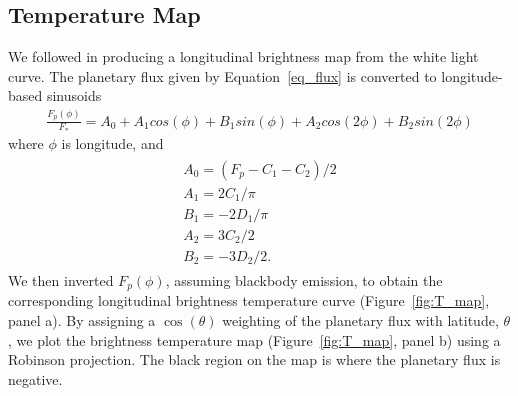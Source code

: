 \documentclass[pdflatex,sn-standardnature]{sn-jnl}%
\begin{document}


\subsection*{Temperature Map}



We followed \cite{cowan2008} in producing a longitudinal brightness map from the white light curve. The planetary flux given by Equation~\ref{eq_flux} is converted to longitude-based sinusoids 
\begin{align}
    \frac{F_p(\phi)}{F_*} = A_0 +A_1cos(\phi)+B_1sin(\phi)+A_2cos(2\phi)+B_2sin(2\phi)
\end{align}
where $\phi$ is longitude, and 
\begin{align}
\begin{array}{l}
A_0 = (F_p-C_1-C_2)/2 \\
A_1 = 2C_1/\pi \\
B_1 = -2D_1/\pi \\
A_2 = 3C_2/2 \\
B_2=-3D_2/2.
\end{array}
\end{align}
We then inverted $F_p(\phi)$, assuming blackbody emission, to obtain the corresponding longitudinal brightness temperature curve (Figure~\ref{fig:T_map}, panel a).  By assigning a $\cos(\theta)$ weighting of the planetary flux with latitude, $\theta$, we plot the brightness temperature map (Figure~\ref{fig:T_map}, panel b) using a Robinson projection.  The black region on the map is where the planetary flux is negative. 
\end{document}

